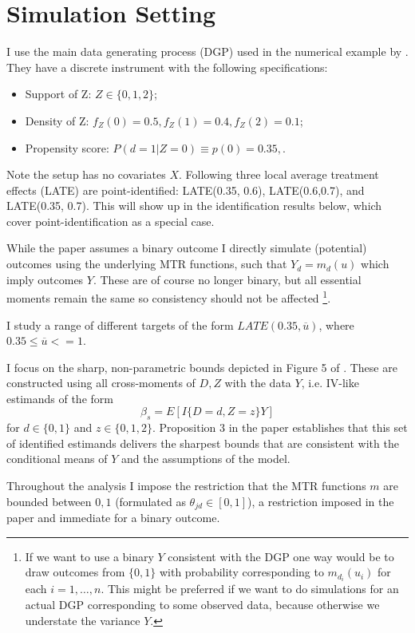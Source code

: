 \documentclass[11pt, a4paper, leqno]{article}
\begin{document}
\section{Simulation Setting} \label{sec:4_sim}
I use the main data generating process (DGP) used in the numerical example by \cite{mogstad2018using}.
They have a discrete instrument with the following specifications:
\begin{itemize}
    \item Support of Z: $Z\in\{0,1,2\}$;
    \item Density of Z: $f_Z(0) = 0.5, f_Z(1)=0.4, f_Z(2)=0.1$;
    \item Propensity score: $P(d=1|Z=0) \equiv p(0) = 0.35,   $.
\end{itemize}
Note the setup has no covariates $X$. Following \citet{imbens1994identification} three local average treatment effects (LATE) are point-identified: LATE(0.35, 0.6), LATE(0.6,0.7), and LATE(0.35, 0.7).
This will show up in the identification results below, which cover point-identification as a special case.

While the paper assumes a binary outcome I directly simulate (potential) outcomes using the underlying MTR functions, such that $Y_d = m_d(u)$ which imply outcomes $Y$.
These are of course no longer binary, but all essential moments remain the same so consistency should not be affected
\footnote{If we want to use a binary $Y$ consistent with the DGP one way would be to draw outcomes from $\{0,1\}$ with probability corresponding to $m_{d_i}(u_i)$ for each $i=1,\ldots, n$. This might be preferred if we want to do simulations for an actual DGP corresponding to some observed data, because otherwise we understate the variance $Y$.}.

I study a range of different targets of the form $LATE(0.35, \overline{u})$, where $0.35 \leq \overline{u} <= 1$.

I focus on the sharp, non-parametric bounds depicted in Figure 5 of \cite{mogstad2018using}.
These are constructed using all cross-moments of $D,Z$ with the data $Y$, i.e. IV-like estimands of the form
\begin{equation*}
    \beta_s = E[I\{D=d, Z=z\}Y]
\end{equation*}
for $d\in\{0,1\}$ and $z\in\{0,1,2\}$. Proposition 3 in the paper establishes that this set of identified estimands
delivers the sharpest bounds that are consistent with the conditional means of $Y$ and the assumptions of the model.

Throughout the analysis I impose the restriction that the MTR functions $m$ are bounded between $0,1$ (formulated as $\theta_{jd}\in[0,1]$), a restriction imposed in the paper and immediate for a binary outcome.
\end{document}
